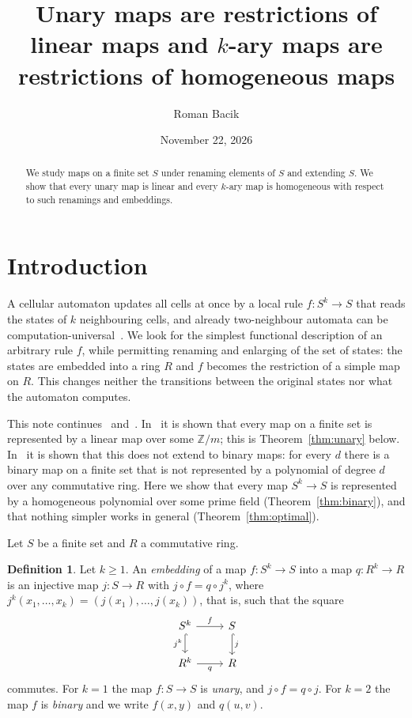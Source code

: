 \documentclass[11pt]{article}
\title{Unary maps are restrictions of linear maps and $k$-ary maps are restrictions of
homogeneous maps}
\author{Roman Bacik}
\date{November 22, 2026}
\theoremstyle{definition}
\newtheorem{definition}{Definition}
\newcommand{\Z}{\mathbb{Z}}
\begin{document}
\maketitle

\begin{abstract}
We study maps on a finite set $S$ under renaming elements of $S$ and extending $S$. We show that
every unary map is linear and every $k$-ary map is homogeneous with respect to such renamings and
embeddings.
\end{abstract}

\section{Introduction}

A cellular automaton updates all cells at once by a local rule $f\colon S^k\to S$ that reads the
states of $k$ neighbouring cells, and already two-neighbour automata can be
computation-universal~\cite{smith}. We look for the simplest functional description of an arbitrary rule $f$, while
permitting renaming and enlarging of the set of states: the states are embedded into a ring $R$
and $f$ becomes the restriction of a simple map on $R$. This changes neither the transitions
between the original states nor what the automaton computes.

This note continues~\cite{finlin} and~\cite{finbin}. In~\cite{finlin} it is shown that every map
on a finite set is represented by a linear map over some $\Z/m$; this is
Theorem~\ref{thm:unary} below. In~\cite{finbin} it is shown that this does not extend to binary
maps: for every $d$ there is a binary map on a finite set that is not represented by a
polynomial of degree $d$ over any commutative ring. Here we show that every map $S^k\to S$
is represented by a homogeneous polynomial over some prime field (Theorem~\ref{thm:binary}), and
that nothing simpler works in general (Theorem~\ref{thm:optimal}).

Let $S$ be a finite set and $R$ a commutative ring.

\begin{definition}
Let $k\ge 1$. An \emph{embedding} of a map $f\colon S^k\to S$ into a map $q\colon R^k\to R$ is an
injective map $j\colon S\to R$ with $j\circ f=q\circ j^k$, where
$j^k(x_1,\dots,x_k)=(j(x_1),\dots,j(x_k))$, that is, such that the square
\[
\begin{tikzcd}
S^k \arrow[r,"f"] \arrow[d,hook,"j^k"'] & S \arrow[d,hook,"j"] \\
R^k \arrow[r,"q"'] & R
\end{tikzcd}
\]
commutes. For $k=1$ the map $f\colon S\to S$ is \emph{unary}, and $j\circ f=q\circ j$. For $k=2$
the map $f$ is \emph{binary} and we write $f(x,y)$ and $q(u,v)$.
\end{definition}
\end{document}
